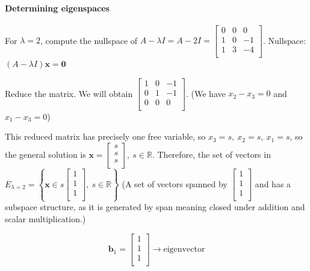 \documentclass[12pt]{article}
\theoremstyle{plain}
\theoremstyle{remark}
\theoremstyle{definition}
\begin{document}
\paragraph{Determining eigenspaces}

For \(\lambda = 2\), compute the nullspace of
\(A - \lambda I = A - 2I = \begin{bmatrix}
0 & 0 & 0 \\
1 & 0 & - 1 \\
1 & 3 & - 4 \\
\end{bmatrix}\). Nullspace:
\((A - \lambda I)\mathbf{x} = \mathbf{0}\)

Reduce the matrix. We will obtain \(\begin{bmatrix}
1 & 0 & - 1 \\
0 & 1 & - 1 \\
0 & 0 & 0 \\
\end{bmatrix}\). (We have \(x_{2} - x_{3} = 0\) and
\(x_{1} - x_{3} = 0\))

This reduced matrix has precisely one free variable, so
\(x_{3} = s,\ x_{2} = s,\ x_{1} = s\), so the general solution is
\(\mathbf{x} = \begin{bmatrix}
s \\
s \\
s \\
\end{bmatrix},\ s\mathbb{\in R}\). Therefore, the set of vectors in
\(E_{\lambda = 2} = \left\{ \mathbf{x} \in s\begin{bmatrix}
1 \\
1 \\
1 \\
\end{bmatrix},\ s\mathbb{\in R} \right\}\) (A set of vectors spanned by
\(\begin{bmatrix}
1 \\
1 \\
1 \\
\end{bmatrix}\) and has a subspace structure, as it is generated by span
meaning closed under addition and scalar multiplication.)

\[{\mathbf{b}}_{1} = \begin{bmatrix}
1 \\
1 \\
1 \\
\end{bmatrix} \rightarrow \text{eigenv}\text{ector}\]
\end{document}
